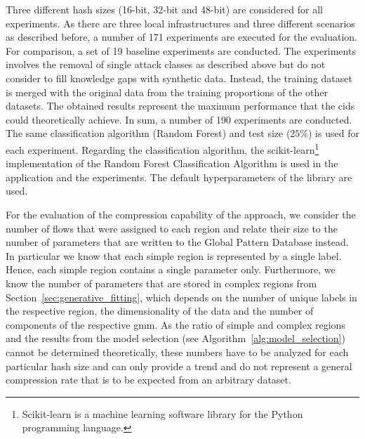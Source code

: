 \documentclass[../../main.tex]{subfiles}
\begin{document}
Three different hash sizes (16-bit, 32-bit and 48-bit) are considered for all experiments. As there are three local infrastructures and three different scenarios as described before, a number of 171 experiments are executed for the evaluation. For comparison, a set of 19 baseline experiments are conducted. The experiments involves the removal of single attack classes as described above but do not consider to fill knowledge gaps with synthetic data. Instead, the training dataset is merged with the original data from the training proportions of the other datasets. The obtained results represent the maximum performance that the \gls{cids} could theoretically achieve. In sum, a number of 190 experiments are conducted. The same classification algorithm (Random Forest) and test size ($25\%$) is used for each experiment. Regarding the classification algorithm, the scikit-learn\footnote{Scikit-learn is a machine learning software library for the Python programming language.} implementation of the Random Forest Classification Algorithm \cite{breiman2001random} is used in the application and the experiments. The default hyperparameters of the library are used. 

For the evaluation of the compression capability of the approach, we consider the number of flows that were assigned to each region and relate their size to the number of parameters that are written to the Global Pattern Database instead. In particular we know that each simple region is represented by a single label. Hence, each simple region contains a single parameter only. Furthermore, we know the number of parameters that are stored in complex regions from Section~\ref{sec:generative_fitting}, which depends on the number of unique labels in the respective region, the dimensionality of the data and the number of components of the respective \gls{gmm}. As the ratio of simple and complex regions and the results from the model selection (see Algorithm~\ref{alg:model_selection}) cannot be determined theoretically, these numbers have to be analyzed for each particular hash size and can only provide a trend and do not represent a general compression rate that is to be expected from an arbitrary dataset. 
\end{document}
